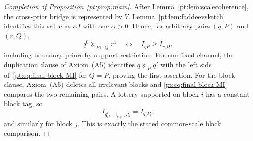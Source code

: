 \begin{proof}[Completion of Proposition~\ref{pt:prop:main}]
After Lemma~\ref{pt:lem:scalecoherence}, the cross-prior bridge is represented
by $V$.  Lemma~\ref{pt:lem:faddeevsketch} identifies this value as
$\alpha I$ with one $\alpha>0$.  Hence, for arbitrary pairs $(q,P)$ and
$(r,Q)$,
\[
 q^0\succeq_{P\sqcup Q}r^1
 \quad\Longleftrightarrow\quad
 I_{qP}\ge I_{r,Q},
\tag{BMI}\label{pt:eq:final-block-MI}
\]
including boundary priors by support restriction.  For one fixed channel,
the duplication clause of Axiom~\textup{(A5)} identifies
$q\succeq_Pq'$ with the left side of~\eqref{pt:eq:final-block-MI} for
$Q=P$, proving the first assertion.  For the block clause,
Axiom~\textup{(A5)} deletes all irrelevant blocks and
\eqref{pt:eq:final-block-MI} compares the two remaining pairs.  A lottery
supported on block $i$ has a constant block tag, so
\[
 I_{q_i^i,\,\bigsqcup_{k\in J}P_k}
 =I_{q_iP_i},
\]
and similarly for block $j$.  This is exactly the stated common-scale block
comparison.
\end{proof}

